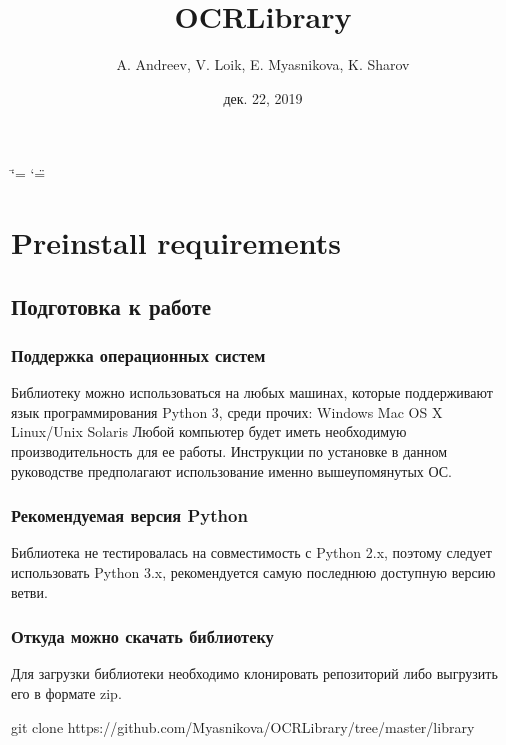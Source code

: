 \documentclass[letterpaper,10pt,russian]{sphinxmanual}
\title{OCRLibrary}
\date{дек. 22, 2019}
\author{A.\@{} Andreev, V.\@{} Loik, E.\@{} Myasnikova, K.\@{} Sharov}
\begin{document}
\ifdefined\shorthandoff
  \ifnum\catcode`\=\string=\active\shorthandoff{=}\fi
  \ifnum\catcode`\"=\active{}\fi
\fi

\pagestyle{empty}
\sphinxmaketitle
\pagestyle{plain}
\sphinxtableofcontents
\pagestyle{normal}
\label{\detokenize{index::doc}}



\chapter{Pre\sphinxhyphen{}install requirements}
\label{\detokenize{Installation:pre-install-requirements}}\label{\detokenize{Installation::doc}}

\section{Подготовка к работе}
\label{\detokenize{Installation:id1}}

\subsection{Поддержка операционных систем}
\label{\detokenize{Installation:id2}}
Библиотеку можно использоваться на любых машинах, которые поддерживают язык программирования Python 3, среди прочих:
\sphinxhyphen{} Windows
\sphinxhyphen{} Mac OS X
\sphinxhyphen{} Linux/Unix
\sphinxhyphen{} Solaris
Любой компьютер будет иметь необходимую производительность для ее работы. Инструкции по установке в данном руководстве предполагают использование именно вышеупомянутых ОС.


\subsection{Рекомендуемая версия Python}
\label{\detokenize{Installation:python}}
Библиотека не тестировалась на совместимость с Python 2.x, поэтому следует использовать Python 3.x, рекомендуется \sphinxhyphen{} самую последнюю доступную версию ветви.


\subsection{Откуда можно скачать библиотеку}
\label{\detokenize{Installation:id3}}
Для загрузки библиотеки необходимо клонировать репозиторий  либо выгрузить его в формате zip.

\begin{sphinxVerbatim}[commandchars=\\\{\}]
git clone https://github.com/Myasnikova/OCRLibrary/tree/master/library
\end{sphinxVerbatim}
\end{document}
